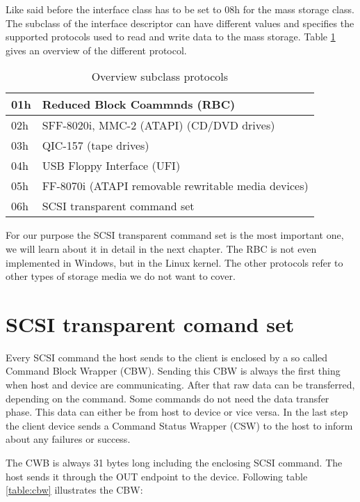 Like said before the interface class has to be set to 08h for the mass storage class. The subclass of the interface descriptor can have different values and specifies the supported protocols used to read and write data to the mass storage. Table \ref{table:subclass} gives an overview of the different protocol.

\begin{table}[ht]
\caption{Overview subclass protocols \cite{usb_ms_jan}}
\centering
\begin{tabular}{|l|l|}
\hline\hline
01h & Reduced Block Coammnds (RBC) \\ \hline
02h & SFF-8020i, MMC-2 (ATAPI) (CD/DVD drives) \\ \hline
03h & QIC-157 (tape drives) \\ \hline
04h & USB Floppy Interface (UFI) \\ \hline
05h & FF-8070i (ATAPI removable rewritable media devices) \\ \hline
06h & SCSI transparent command set \\ \hline
\end{tabular}
\label{table:subclass}
\end{table}

For our purpose the SCSI transparent command set is the most important one, we will learn about it in detail in the next chapter. The RBC is not even implemented in Windows, but in the Linux kernel\cite{usb_ms_jan}. The other protocols refer to other types of storage media we do not want to cover.

\section{SCSI transparent comand set}

Every SCSI command the host sends to the client is enclosed by a so called Command Block Wrapper (CBW). Sending this CBW is always the first thing when host and device are communicating. After that raw data can be transferred, depending on the command. Some commands do not need the data transfer phase. This data can either be from host to device or vice versa. In the last step the client device sends a Command Status Wrapper (CSW) to the host to inform about any failures or success.

The CWB is always 31 bytes long including the enclosing SCSI command. The host sends it through the OUT endpoint to the device. Following table \ref{table:cbw} illustrates the CBW:

